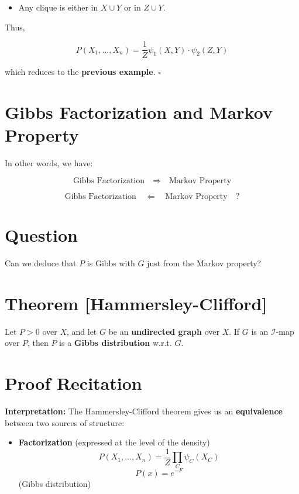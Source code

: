 \documentclass{article}%
\begin{document}
\begin{itemize}
    \item Any clique is either in \( X \cup Y \) or in \( Z \cup Y \).
\end{itemize}

Thus,

\[
P(X_1, \dots, X_n) = \frac{1}{Z} \psi_1(X,Y) \cdot \psi_2(Z,Y)
\]

which reduces to the \textbf{previous example}. \(\square\)

\section*{Gibbs Factorization and Markov Property}

In other words, we have:

\[
\text{Gibbs Factorization} \quad \Rightarrow \quad \text{Markov Property}
\]

\[
\text{Gibbs Factorization} \quad \Leftarrow \quad \text{Markov Property} \quad ?
\]

\section*{Question}

Can we deduce that \( P \) is Gibbs with \( G \) just from the Markov property?


\section*{Theorem [Hammersley-Clifford]}

Let \( P > 0 \) over \( X \), and let \( G \) be an \textbf{undirected graph} over \( X \). If \( G \) is an \(\mathcal{I}\)-map over \( P \), then \( P \) is a \textbf{Gibbs distribution} w.r.t. \( G \).

\section*{Proof Recitation}

\textbf{Interpretation:} The Hammersley-Clifford theorem gives us an \textbf{equivalence} between two sources of structure:

\begin{itemize}
    \item \textbf{Factorization} (expressed at the level of the density)
    \[
    P(X_1, \dots, X_n) = \frac{1}{Z} \prod_C \psi_C (X_C)
    \]
    \[
    P(x) = e^{-F}
    \]
    (Gibbs distribution)
\end{itemize}
\end{document}
